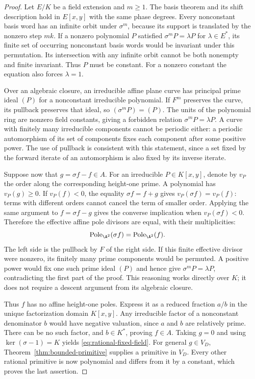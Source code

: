 \begin{proof}
Let $E/K$ be a field extension and $m\ge1$.  The basis theorem and
its shift description hold in $E[x,y]$ with the same phase degrees.
Every nonconstant basis word has an infinite orbit under $\sigma^m$,
because its support is translated by the nonzero step $mk$.
If a nonzero polynomial $P$ satisfied $\sigma^mP=\lambda P$ for
$\lambda\in E^*$, its finite set of occurring nonconstant basis
words would be invariant under this permutation.  Its intersection
with any infinite orbit cannot be both nonempty and finite invariant.
Thus $P$ must be constant.  For a nonzero constant the equation also
forces $\lambda=1$.

Over an algebraic closure, an irreducible affine plane curve has
principal prime ideal $(P)$ for a nonconstant irreducible polynomial.
If $F^m$ preserves the curve, its pullback preserves that ideal, so
$(\sigma^mP)=(P)$.  The units of the polynomial ring are nonzero
field constants, giving a forbidden relation
$\sigma^mP=\lambda P$.  A curve with finitely many irreducible
components cannot be periodic either: a periodic automorphism of its
set of components fixes each component after some positive power.
The use of pullback is consistent with this statement, since a set
fixed by the forward iterate of an automorphism is also fixed by its
inverse iterate.

Suppose now that $g=\sigma f-f\in A$.  For an irreducible
$P\in K[x,y]$, denote by $v_P$ the order along the corresponding
height-one prime.  A polynomial has $v_P(g)\ge0$.
If $v_P(f)<0$, the equality $\sigma f=f+g$ gives
$v_P(\sigma f)=v_P(f)$: terms with different orders cannot cancel
the term of smaller order.  Applying the same argument to
$f=\sigma f-g$ gives the converse implication when
$v_P(\sigma f)<0$.  Therefore the effective affine pole divisors
are equal, with their multiplicities:
\begin{equation}
  \operatorname{Pole}_{\A^2}(\sigma f)
    =\operatorname{Pole}_{\A^2}(f).
  \label{eq:affine-pole-invariance}
\end{equation}
The left side is the pullback by $F$ of the right side.  If this
finite effective divisor were nonzero, its finitely many prime
components would be permuted.  A positive power would fix one such
prime ideal $(P)$ and hence give $\sigma^mP=\lambda P$, contradicting
the first part of the proof.  This reasoning works directly over $K$;
it does not require a descent argument from its algebraic closure.

Thus $f$ has no affine height-one poles.  Express it as a reduced
fraction $a/b$ in the unique factorization domain $K[x,y]$.
Any irreducible factor of a nonconstant denominator $b$ would have
negative valuation, since $a$ and $b$ are relatively prime.
There can be no such factor, and $b\in K^*$, proving $f\in A$.
Taking $g=0$ and using $\ker(\sigma-1)=K$ yields
\eqref{eq:rational-fixed-field}.  For general $g\in V_D$,
Theorem~\ref{thm:bounded-primitive} supplies a primitive in $V_D$.
Every other rational primitive is now polynomial and differs from
it by a constant, which proves the last assertion.
\end{proof}
